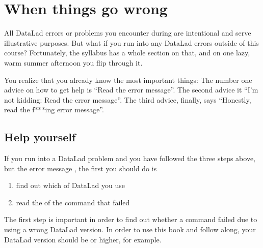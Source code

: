 \chapter{When things go wrong}
\label{\detokenize{basics/101-135-help:when-things-go-wrong}}\label{\detokenize{basics/101-135-help:help}}\label{\detokenize{basics/101-135-help::doc}}

\sphinxAtStartPar
All DataLad errors or problems you encounter during  are intentional
and serve illustrative purposes. But what if you run into any DataLad errors
outside of this course?
Fortunately, the syllabus has a whole section on that, and on
one lazy, warm summer afternoon you flip through it.

\sphinxAtStartPar
You realize that you already know the most important things:
The number one advice on how to get help is
“Read the error message”.
The second advice it
“I’m not kidding: Read the error message”.
The third advice, finally, says
“Honestly, read the f***ing error message”.


\section{Help yourself}
\label{\detokenize{basics/101-135-help:help-yourself}}
\sphinxAtStartPar
If you run into a DataLad problem and you have followed the three
steps above, but the error message
,
the first you should do is
\begin{enumerate}
%
\item {} 
\sphinxAtStartPar
find out which  of DataLad you use

\item {} 
\sphinxAtStartPar
read the  of the command that failed

\end{enumerate}

\sphinxAtStartPar
The first step is important in order to find out whether a
command failed due to using a wrong DataLad version. In order
to use this book and follow along, your DataLad version
should be  or higher, for example.

